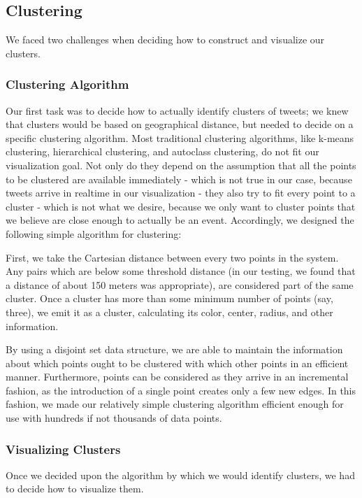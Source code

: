 \documentclass[pdftex,12pt,a4paper]{article}
\begin{document}
\subsection{Clustering}
We faced two challenges when deciding how to construct and visualize our clusters.

\subsubsection{Clustering Algorithm}
Our first task was to decide how to actually identify clusters of tweets; we knew that clusters would be based on geographical distance, but needed to decide on a specific clustering algorithm. Most traditional clustering algorithms, like k-means clustering, hierarchical clustering, and autoclass clustering, do not fit our visualization goal. Not only do they depend on the assumption that all the points to be clustered are available immediately - which is not true in our case, because tweets arrive in realtime in our visualization - they also try to fit every point to a cluster - which is not what we desire, because we only want to cluster points that we believe are close enough to actually be an event. Accordingly, we designed the following simple algorithm for clustering:

First, we take the Cartesian distance between every two points in the system.
Any pairs which are below some threshold distance (in our testing, we found that
a distance of about 150 meters was appropriate), are considered part of the same
cluster. Once a cluster has more than some minimum number of points (say,
three), we emit it as a cluster, calculating its color, center, radius, and
other information.

By using a disjoint set data structure, we are able to maintain the information
about which points ought to be clustered with which other points in an efficient
manner. Furthermore, points can be considered as they arrive in an incremental
fashion, as the introduction of a single point creates only a few new edges. In
this fashion, we made our relatively simple clustering algorithm efficient
enough for use with hundreds if not thousands of data points.

\subsubsection{Visualizing Clusters}
Once we decided upon the algorithm by which we would identify clusters, we had to decide how to visualize them. 
\end{document}
